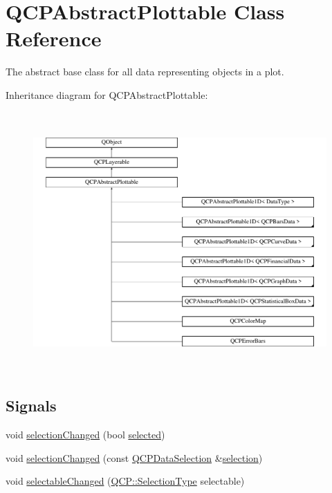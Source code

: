 \hypertarget{class_q_c_p_abstract_plottable}{}\section{Q\+C\+P\+Abstract\+Plottable Class Reference}
\label{class_q_c_p_abstract_plottable}


The abstract base class for all data representing objects in a plot.  


Inheritance diagram for Q\+C\+P\+Abstract\+Plottable\+:\begin{figure}[H]
\begin{center}
\leavevmode
\includegraphics[height=9.967637cm]{class_q_c_p_abstract_plottable}
\end{center}
\end{figure}
\subsection*{Signals}
\begin{DoxyCompactItemize}
\item 
void \mbox{\hyperlink{class_q_c_p_abstract_plottable_a3af66432b1dca93b28e00e78a8c7c1d9}{selection\+Changed}} (bool \mbox{\hyperlink{class_q_c_p_abstract_plottable_a0b3b514474fe93354fc74cfc144184b4}{selected}})
\item 
void \mbox{\hyperlink{class_q_c_p_abstract_plottable_a787a9c39421059006891744b731fa473}{selection\+Changed}} (const \mbox{\hyperlink{class_q_c_p_data_selection}{Q\+C\+P\+Data\+Selection}} \&\mbox{\hyperlink{class_q_c_p_abstract_plottable_a040bf09f41d456284cfd39cc37aa068f}{selection}})
\item 
void \mbox{\hyperlink{class_q_c_p_abstract_plottable_a663b1a44123c8340ac041a29d1e2c973}{selectable\+Changed}} (\mbox{\hyperlink{namespace_q_c_p_ac6cb9db26a564b27feda362a438db038}{Q\+C\+P\+::\+Selection\+Type}} selectable)
\end{DoxyCompactItemize}
